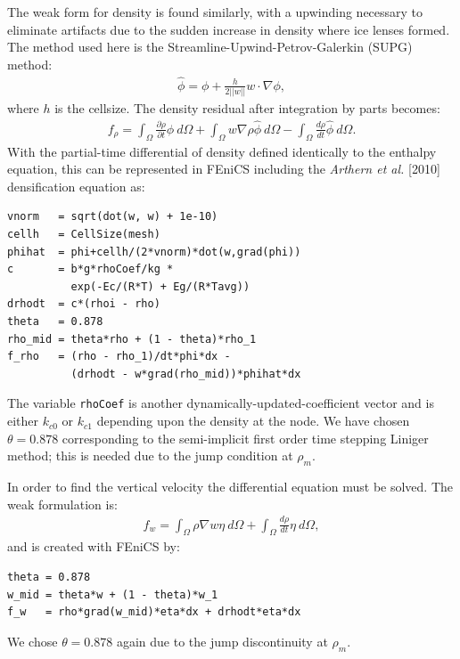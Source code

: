 \documentclass{article}%
\begin{document}
The weak form for density is found similarly, with a upwinding necessary to eliminate artifacts due to the sudden increase in density where ice lenses formed.  The method used here is the Streamline-Upwind-Petrov-Galerkin (SUPG) method:
\begin{align*}
    \hat{\phi} = \phi + \frac{h}{2||w||} w \cdot \nabla{\phi},
\end{align*}
where $h$ is the cellsize.  The density residual after integration by parts becomes:
\begin{align*}
  f_{\rho} = 
    \int_{\Omega} \frac{\partial \rho}{\partial t}\phi\ d \Omega + 
    \int_{\Omega} w\nabla \rho \hat{\phi}\ d \Omega -
    \int_{\Omega}\frac{d \rho}{dt}\hat{\phi}\ d \Omega.
\end{align*}
With the partial-time differential of density defined identically to the enthalpy equation, this can be represented in FEniCS including the \emph{Arthern et al.} [2010] densification equation as:\par
\footnotesize
\begin{verbatim}
vnorm   = sqrt(dot(w, w) + 1e-10)
cellh   = CellSize(mesh)
phihat  = phi+cellh/(2*vnorm)*dot(w,grad(phi))
c       = b*g*rhoCoef/kg * 
          exp(-Ec/(R*T) + Eg/(R*Tavg))
drhodt  = c*(rhoi - rho)
theta   = 0.878
rho_mid = theta*rho + (1 - theta)*rho_1
f_rho   = (rho - rho_1)/dt*phi*dx - 
          (drhodt - w*grad(rho_mid))*phihat*dx
\end{verbatim}
\normalsize
The variable \texttt{rhoCoef} is another dynamically-updated-coefficient vector and is either $k_{c0}$ or $k_{c1}$ depending upon the density at the node.  We have chosen $\theta = 0.878$ corresponding to the semi-implicit first order time stepping Liniger method; this is needed due to the jump condition at $\rho_m$.

In order to find the vertical velocity the differential equation must be solved.  The weak formulation is:
\begin{align*}
  f_{w} = 
    \int_{\Omega} \rho \nabla{w} \eta\ d\Omega + \int_{\Omega} \frac{d\rho}{dt} \eta\ d\Omega,
\end{align*}
and is created with FEniCS by:
\footnotesize
\begin{verbatim}
theta = 0.878
w_mid = theta*w + (1 - theta)*w_1
f_w   = rho*grad(w_mid)*eta*dx + drhodt*eta*dx
\end{verbatim}
\normalsize
We chose $\theta=0.878$ again due to the jump discontinuity at $\rho_m$.
\end{document}
